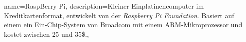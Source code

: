 {
	name={RaspBerry Pi},
	description={Kleiner Einplatinencomputer im Kreditkartenformat, entwickelt von
	der \emph{Raspberry Pi Foundation}.	Basiert auf einem ein Ein-Chip-System von Broadcom
	mit einem ARM-Mikroprozessor und kostet zwischen 25 und 35\$.},
}